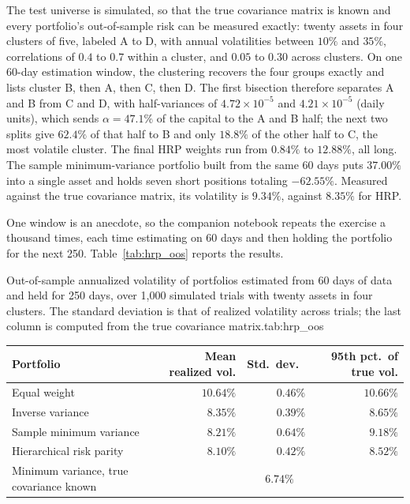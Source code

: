 \documentclass[../ai_in_finance]{subfiles}
\begin{document}
The test universe is simulated, so that the true covariance matrix is known and every portfolio's out-of-sample risk can be measured exactly: twenty assets in four clusters of five, labeled A to D, with annual volatilities between $10\%$ and $35\%$, correlations of $0.4$ to $0.7$ within a cluster, and $0.05$ to $0.30$ across clusters. On one 60-day estimation window, the clustering recovers the four groups exactly and lists cluster B, then A, then C, then D. The first bisection therefore separates A and B from C and D, with half-variances of $4.72\times10^{-5}$ and $4.21\times10^{-5}$ (daily units), which sends $\alpha = 47.1\%$ of the capital to the A and B half; the next two splits give $62.4\%$ of that half to B and only $18.8\%$ of the other half to C, the most volatile cluster. The final HRP weights run from $0.84\%$ to $12.88\%$, all long. The sample minimum-variance portfolio built from the same 60 days puts $37.00\%$ into a single asset and holds seven short positions totaling $-62.55\%$. Measured against the true covariance matrix, its volatility is $9.34\%$, against $8.35\%$ for HRP.

One window is an anecdote, so the companion notebook repeats the exercise a thousand times, each time estimating on 60 days and then holding the portfolio for the next 250. Table~\ref{tab:hrp_oos} reports the results.

\begin{booktable}{Out-of-sample annualized volatility of portfolios estimated from 60 days of data and held for 250 days, over 1,000 simulated trials with twenty assets in four clusters. The standard deviation is that of realized volatility across trials; the last column is computed from the true covariance matrix.}{tab:hrp_oos}
\begin{tabular}{lrrr}
\toprule
Portfolio & Mean realized vol. & Std.\ dev.\ & 95th pct.\ of true vol. \\
\midrule
Equal weight & $10.64\%$ & $0.46\%$ & $10.66\%$ \\
Inverse variance & $8.35\%$ & $0.39\%$ & $8.65\%$ \\
Sample minimum variance & $8.21\%$ & $0.64\%$ & $9.18\%$ \\
Hierarchical risk parity & $8.10\%$ & $0.42\%$ & $8.52\%$ \\
\midrule
Minimum variance, true covariance known & \multicolumn{3}{c}{$6.74\%$} \\
\bottomrule
\end{tabular}
\end{booktable}
\end{document}
